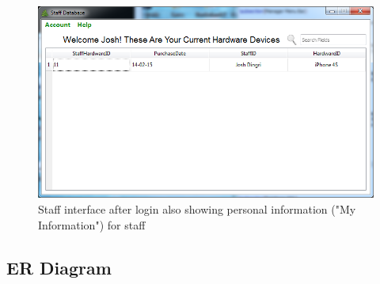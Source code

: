 \begin{figure}[H]
    \includegraphics[width=\textwidth]{./Maintenance/Images/myinfo.png}
    \caption{Staff interface after login also showing personal information ("My Information") for staff} \label{fig:myinfo}
\end{figure}




\subsection{ER Diagram}

